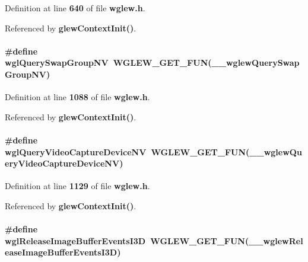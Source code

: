 Definition at line {\bf 640} of file {\bf wglew.\+h}.



Referenced by {\bf glew\+Context\+Init()}.

\paragraph[{wgl\+Query\+Swap\+Group\+NV}]{\setlength{\rightskip}{0pt plus 5cm}\#define wgl\+Query\+Swap\+Group\+NV~{\bf W\+G\+L\+E\+W\+\_\+\+G\+E\+T\+\_\+\+F\+UN}({\bf \+\_\+\+\_\+wglew\+Query\+Swap\+Group\+NV})}\label{wglew_8h_ab591fd9cffa987701c5418e50f79ec36}


Definition at line {\bf 1088} of file {\bf wglew.\+h}.



Referenced by {\bf glew\+Context\+Init()}.

\paragraph[{wgl\+Query\+Video\+Capture\+Device\+NV}]{\setlength{\rightskip}{0pt plus 5cm}\#define wgl\+Query\+Video\+Capture\+Device\+NV~{\bf W\+G\+L\+E\+W\+\_\+\+G\+E\+T\+\_\+\+F\+UN}({\bf \+\_\+\+\_\+wglew\+Query\+Video\+Capture\+Device\+NV})}\label{wglew_8h_ac57a832d515992512befc2a139d21b30}


Definition at line {\bf 1129} of file {\bf wglew.\+h}.



Referenced by {\bf glew\+Context\+Init()}.

\paragraph[{wgl\+Release\+Image\+Buffer\+Events\+I3D}]{\setlength{\rightskip}{0pt plus 5cm}\#define wgl\+Release\+Image\+Buffer\+Events\+I3D~{\bf W\+G\+L\+E\+W\+\_\+\+G\+E\+T\+\_\+\+F\+UN}({\bf \+\_\+\+\_\+wglew\+Release\+Image\+Buffer\+Events\+I3D})}\label{wglew_8h_a15415929244c044ce5327a5f3bbb36cb}


